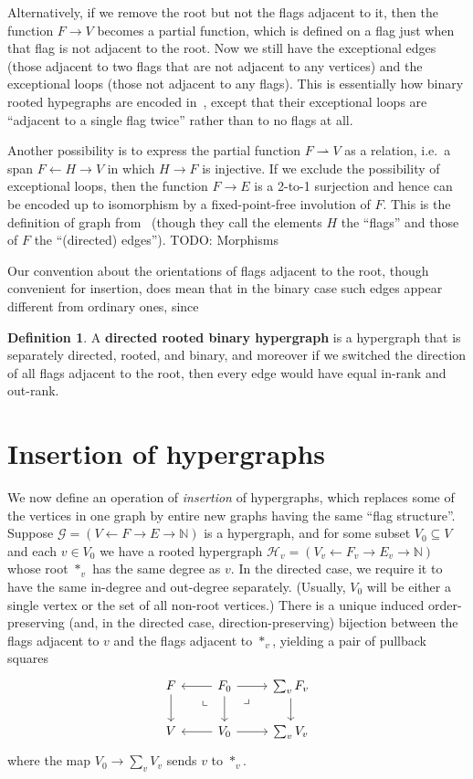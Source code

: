 \documentclass{article}
\theoremstyle{definition}
\newtheorem{defn}[thm]{Definition}
\theoremstyle{remark}
\def\G{\mathcal{G}}
\def\H{\mathcal{H}}
\newcommand{\drpullback}[1][dr]{\ar[#1,phantom,near start,"\lrcorner"]}
\newcommand{\dlpullback}[1][dl]{\ar[#1,phantom,near start,"\llcorner"]}
\let\ot\leftarrow
\def\N{\mathbb{N}}
\begin{document}
Alternatively, if we remove the root but not the flags adjacent to it, then the function $F\to V$ becomes a partial function, which is defined on a flag just when that flag is not adjacent to the root.
Now we still have the exceptional edges (those adjacent to two flags that are not adjacent to any vertices) and the exceptional loops (those not adjacent to any flags).
This is essentially how binary rooted hypegraphs are encoded in~\cite{bb:htapm}, except that their exceptional loops are ``adjacent to a single flag twice'' rather than to no flags at all.

Another possibility is to express the partial function $F\rightharpoonup V$ as a relation, i.e.\ a span $F \ot H \to V$ in which $H\to F$ is injective.
If we exclude the possibility of exceptional loops, then the function $F\to E$ is a 2-to-1 surjection and hence can be encoded up to isomorphism by a fixed-point-free involution of $F$.
This is the definition of graph from~\cite{jk:feynman} (though they call the elements $H$ the ``flags'' and those of $F$ the ``(directed) edges'').
TODO: Morphisms

Our convention about the orientations of flags adjacent to the root, though convenient for insertion, does mean that in the binary case such edges appear different from ordinary ones, since 

\begin{defn}
  A \textbf{directed rooted binary hypergraph} is a hypergraph that is separately directed, rooted, and binary, and moreover if we switched the direction of all flags adjacent to the root, then every edge would have equal in-rank and out-rank.
\end{defn}


\section{Insertion of hypergraphs}
\label{sec:insertion}

We now define an operation of \emph{insertion} of hypergraphs, which replaces some of the vertices in one graph by entire new graphs having the same ``flag structure''.
Suppose $\G = (V\ot F \to E\to \N)$ is a hypergraph, and for some subset $V_0 \subseteq V$ and each $v\in V_0$ we have a rooted hypergraph $\H_v = (V_v \ot F_v \to E_v\to \N)$ whose root $\ast_v$ has the same degree as $v$.
In the directed case, we require it to have the same in-degree and out-degree separately.
(Usually, $V_0$ will be either a single vertex or the set of all non-root vertices.)
There is a unique induced order-preserving (and, in the directed case, direction-preserving) bijection between the flags adjacent to $v$ and the flags adjacent to $\ast_v$, yielding a pair of pullback squares
\[
\begin{tikzcd}
  F \ar[d] & F_0 \ar[l] \dlpullback \ar[d] \ar[r] \drpullback & \sum_v F_v \ar[d]\\
  V & V_0 \ar[l] \ar[r] & \sum_v V_v
\end{tikzcd}
\]
where the map $V_0 \to \sum_v V_v$ sends $v$ to $\ast_v$.
\end{document}
